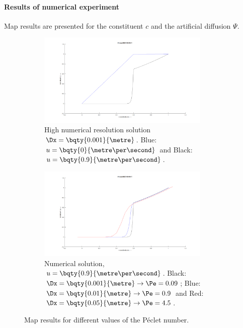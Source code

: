 \paragraph*{Results of numerical experiment}
Map results are presented for the constituent $c$ and the artificial diffusion $\Psi$.
\begin{figure}[H]
    \begin{subfigure}[t]{0.5\textwidth}
        \centering
        \includegraphics[width=0.9\textwidth]{figures/interface_u0d0_u0d9.png}
        \caption{High numerical resolution solution $\Dx=\bqty{0.001}{\metre}$.  Blue: $u =\bqty{0}{\metre\per\second}$ and Black: $u = \bqty{0.9}{\metre\per\second}$.}
    \end{subfigure}
    \hfill
    \begin{subfigure}[t]{0.5\textwidth}
        \centering
        \includegraphics[width=0.9\textwidth]{figures/interface_pe0d09_pe0d9_pe4d5.png}
        \caption{Numerical solution, $u = \bqty{0.9}{\metre\per\second}$. Black: $\Dx = \bqty{0.001}{\metre} \rightarrow \Pe= 0.09$; Blue: $\Dx = \bqty{0.01}{\metre} \rightarrow \Pe = 0.9$ and Red: $\Dx = \bqty{0.05}{\metre} \rightarrow \Pe = 4.5$.}
    \end{subfigure}
    \caption{Map results for different values of the P\'eclet number.}
\end{figure}
